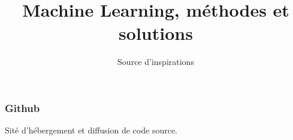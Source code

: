 \documentclass{formation}
\title{Machine Learning, méthodes et solutions}
\subtitle{Source d'inspirations}
\begin{document}
\maketitle

\begin{frame}
  \frametitle{Github}
  Sité d'hébergement et diffusion de code source.
\end{frame}
\end{document}
